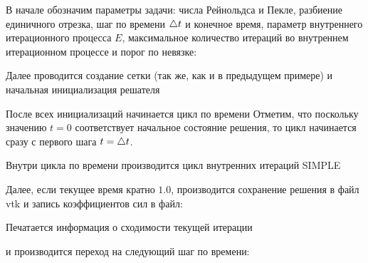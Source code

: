 В начале обозначим параметры задачи:
числа Рейнольдса и Пекле,
разбиение единичного отрезка,
шаг по времени $\triangle t$ и конечное время, 
параметр внутреннего итерационного процесса $E$, 
максимальное количество итераций во внутреннем итерационном процессе
и порог по невязке:

Далее проводится создание сетки (так же, как и в предыдущем примере) и начальная инициализация
решателя

После всех инициализаций начинается цикл по времени
Отметим, что поскольку значению $t=0$ соответствует начальное
состояние решения, то цикл начинается сразу с первого шага $t=\triangle t$.

Внутри цикла по времени производится цикл
внутренних итераций SIMPLE

Далее, если текущее время кратно $1.0$, производится сохранение
решения в файл vtk и запись коэффициентов сил в файл:

Печатается информация о сходимости текущей итерации

и производится переход на следующий шаг по времени:


